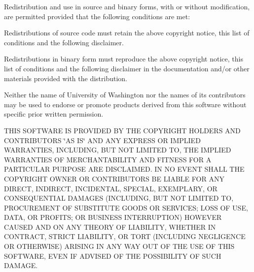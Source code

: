 \begin{DoxyParagraph}{}
Redistribution and use in source and binary forms, with or without modification, are permitted provided that the following conditions are met\+:
\end{DoxyParagraph}
\begin{DoxyItemize}
\item Redistributions of source code must retain the above copyright notice, this list of conditions and the following disclaimer.\end{DoxyItemize}
\begin{DoxyItemize}
\item Redistributions in binary form must reproduce the above copyright notice, this list of conditions and the following disclaimer in the documentation and/or other materials provided with the distribution.\end{DoxyItemize}
\begin{DoxyItemize}
\item Neither the name of University of Washington nor the names of its contributors may be used to endorse or promote products derived from this software without specific prior written permission.\end{DoxyItemize}
\begin{DoxyParagraph}{}
T\+H\+IS S\+O\+F\+T\+W\+A\+RE IS P\+R\+O\+V\+I\+D\+ED BY T\+HE C\+O\+P\+Y\+R\+I\+G\+HT H\+O\+L\+D\+E\+RS A\+ND C\+O\+N\+T\+R\+I\+B\+U\+T\+O\+RS \char`\"{}\+A\+S I\+S\char`\"{} A\+ND A\+NY E\+X\+P\+R\+E\+SS OR I\+M\+P\+L\+I\+ED W\+A\+R\+R\+A\+N\+T\+I\+ES, I\+N\+C\+L\+U\+D\+I\+NG, B\+UT N\+OT L\+I\+M\+I\+T\+ED TO, T\+HE I\+M\+P\+L\+I\+ED W\+A\+R\+R\+A\+N\+T\+I\+ES OF M\+E\+R\+C\+H\+A\+N\+T\+A\+B\+I\+L\+I\+TY A\+ND F\+I\+T\+N\+E\+SS F\+OR A P\+A\+R\+T\+I\+C\+U\+L\+AR P\+U\+R\+P\+O\+SE A\+RE D\+I\+S\+C\+L\+A\+I\+M\+ED. IN NO E\+V\+E\+NT S\+H\+A\+LL T\+HE C\+O\+P\+Y\+R\+I\+G\+HT O\+W\+N\+ER OR C\+O\+N\+T\+R\+I\+B\+U\+T\+O\+RS BE L\+I\+A\+B\+LE F\+OR A\+NY D\+I\+R\+E\+CT, I\+N\+D\+I\+R\+E\+CT, I\+N\+C\+I\+D\+E\+N\+T\+AL, S\+P\+E\+C\+I\+AL, E\+X\+E\+M\+P\+L\+A\+RY, OR C\+O\+N\+S\+E\+Q\+U\+E\+N\+T\+I\+AL D\+A\+M\+A\+G\+ES (I\+N\+C\+L\+U\+D\+I\+NG, B\+UT N\+OT L\+I\+M\+I\+T\+ED TO, P\+R\+O\+C\+U\+R\+E\+M\+E\+NT OF S\+U\+B\+S\+T\+I\+T\+U\+TE G\+O\+O\+DS OR S\+E\+R\+V\+I\+C\+ES; L\+O\+SS OF U\+SE, D\+A\+TA, OR P\+R\+O\+F\+I\+TS; OR B\+U\+S\+I\+N\+E\+SS I\+N\+T\+E\+R\+R\+U\+P\+T\+I\+ON) H\+O\+W\+E\+V\+ER C\+A\+U\+S\+ED A\+ND ON A\+NY T\+H\+E\+O\+RY OF L\+I\+A\+B\+I\+L\+I\+TY, W\+H\+E\+T\+H\+ER IN C\+O\+N\+T\+R\+A\+CT, S\+T\+R\+I\+CT L\+I\+A\+B\+I\+L\+I\+TY, OR T\+O\+RT (I\+N\+C\+L\+U\+D\+I\+NG N\+E\+G\+L\+I\+G\+E\+N\+CE OR O\+T\+H\+E\+R\+W\+I\+SE) A\+R\+I\+S\+I\+NG IN A\+NY W\+AY O\+UT OF T\+HE U\+SE OF T\+H\+IS S\+O\+F\+T\+W\+A\+RE, E\+V\+EN IF A\+D\+V\+I\+S\+ED OF T\+HE P\+O\+S\+S\+I\+B\+I\+L\+I\+TY OF S\+U\+CH D\+A\+M\+A\+GE. 
\end{DoxyParagraph}

